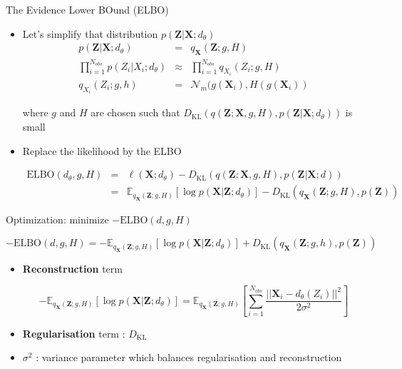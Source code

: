 \documentclass[compress,10pt]{beamer}
\begin{document}
\begin{frame}{The Evidence Lower BOund (ELBO)}

\begin{itemize}

\item

Let's simplify that distribution 
$p(\mathbf{Z}  | \mathbf{X};d_{\theta})$ 
\begin{eqnarray*}
 p(\mathbf{Z}  | \mathbf{X};d_{\theta}) &=& q_{\mathbf{X}}(\mathbf{Z};g,H)\\
 \prod_{i=1}^{N_{obs}} p(Z_i |  X_i; d_{\theta}) &\approx&     \prod_{i=1}^{N_{obs}} q_{ X_i}(Z_i;g,H)\\
 q_{X_i}(Z_i;g,h) &=&\mathcal{N}_m(g(\textbf{X}_i),H(g(\textbf{X}_i))
 \end{eqnarray*}
 
 where $g$ and $H$ are chosen such that 
$D_\text{KL}(q(\mathbf{Z};\mathbf{X},g,H), p(\mathbf{Z} |\mathbf{X};d_\theta))$ is small

\item
  Replace the likelihood by the ELBO


\begin{eqnarray*}
\text{ELBO}(d_{\theta},g,H) &=&\ell(\mathbf{X}; d_{\theta})-  D_\text{KL}(q(\mathbf{Z};\mathbf{X},g,H), p(\mathbf{Z} |\mathbf{X};d))\\
&=& \mathbb{E}_{q_{\mathbf{X}}(\mathbf{Z};g,H)}[\log p(\mathbf{X} | \mathbf{Z};d_{\theta})]- D_\text{KL}(q_{\mathbf{X}}(\mathbf{Z};g,H), p(\mathbf{Z}))
\end{eqnarray*}

\end{itemize}

\end{frame}
\begin{frame}{Optimization: minimize $-\text{ELBO}(d,g,H) $ }
 


\[-\text{ELBO}(d,g,H)  =-  \mathbb{E}_{q_{\mathbf{X}}(\mathbf{Z};g,H)}[\log p(\mathbf{X} | \mathbf{Z};d_\theta)] +  D_\text{KL}(q_{\mathbf{X}}(\mathbf{Z};g,h), p(\mathbf{Z}))\]

\begin{itemize}
\item \textbf{Reconstruction} term 

$$-\mathbb{E}_{q_{\mathbf{X}}(\mathbf{Z};g,H)}[\log p(\mathbf{X} | \mathbf{Z};d_\theta)] = \mathbb{E}_{q_{\mathbf{X}}(\mathbf{Z};g,H)}  \left[\sum_{i=1}^{N_{obs}}   \frac{||\mathbf{X}_i - d_\theta(Z_i)||^2}{2\sigma^2}\right]$$ 

\item \textbf{Regularisation} term :  $D_\text{KL}$
  
\item  $\sigma^2$ : variance parameter which balances regularisation and  reconstruction
\end{itemize}
\end{frame}
\end{document}
